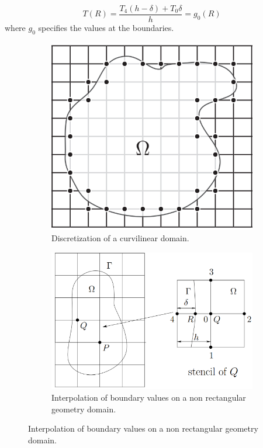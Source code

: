 \begin{equation}
   T(R) = \frac{T_4(h-\delta) + T_0 \delta}{h} = g_0(R)
   \label{eq:interpolateboundary}
\end{equation}
where $g_0$ specifies the values at the boundaries.
\begin{figure}
\label{fig:approximation_complex_geometries}
\caption{Approximation of curvilinear geometries on a square uniform computational grid. }
	\begin{subfigure}[t]{0.381\textwidth}
		\includegraphics[width=\linewidth]{./images/CA_FDM/grid_custom_shape}
		\caption{Discretization of a curvilinear domain.}
		\label{fig:gridcustomshape}
	\end{subfigure}\hspace{0.4cm}	
	\begin{subfigure}[t]{0.52\textwidth}
		\includegraphics[width=\linewidth]{./images/CA_FDM/gridcustom_shape2}
		\caption{Interpolation of boundary values on a non rectangular geometry domain.}
		\label{fig:gridcustom_shape2}
	\end{subfigure}
\end{figure}
